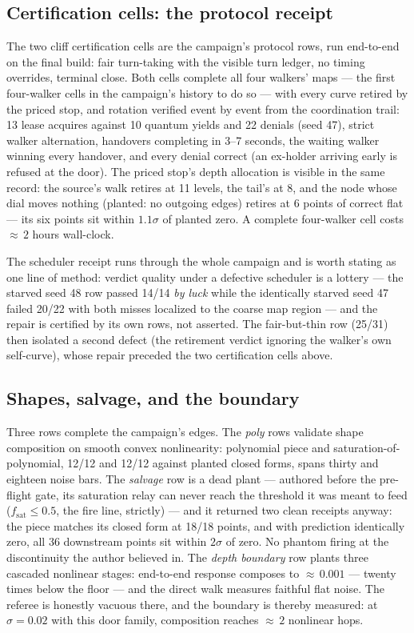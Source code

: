 \documentclass[11pt,a4paper]{article}
\begin{document}
\subsection{Certification cells: the protocol receipt}
\label{sec:cert}

The two cliff certification cells are the campaign's protocol rows,
run end-to-end on the final build: fair turn-taking with the visible
turn ledger, no timing overrides, terminal close. Both cells complete
all four walkers' maps --- the first four-walker cells in the
campaign's history to do so --- with every curve retired by the priced
stop, and rotation verified event by event from the coordination
trail: 13 lease acquires against 10 quantum yields and 22 denials
(seed 47), strict walker alternation, handovers completing in 3--7
seconds, the waiting walker winning every handover, and every denial
correct (an ex-holder arriving early is refused at the door). The
priced stop's depth allocation is visible in the same record: the
source's walk retires at 11 levels, the tail's at 8, and the node
whose dial moves nothing (planted: no outgoing edges) retires at 6
points of correct flat --- its six points sit within $1.1\sigma$ of
planted zero. A complete four-walker cell costs ${\approx}\,2$ hours
wall-clock.

The scheduler receipt runs through the whole campaign and is worth
stating as one line of method: verdict quality under a defective
scheduler is a lottery --- the starved seed 48 row passed 14/14
\emph{by luck} while the identically starved seed 47 failed 20/22
with both misses localized to the coarse map region --- and the
repair is certified by its own rows, not asserted. The fair-but-thin
row (25/31) then isolated a second defect (the retirement verdict
ignoring the walker's own self-curve), whose repair preceded the two
certification cells above.

\subsection{Shapes, salvage, and the boundary}
\label{sec:salvage}

Three rows complete the campaign's edges. The \emph{poly} rows
validate shape composition on smooth convex nonlinearity: polynomial
piece and saturation-of-polynomial, 12/12 and 12/12 against planted
closed forms, spans thirty and eighteen noise bars. The \emph{salvage}
row is a dead plant --- authored before the pre-flight gate, its
saturation relay can never reach the threshold it was meant to feed
($f_{\text{sat}} \le 0.5$, the fire line, strictly) --- and it
returned two clean receipts anyway: the piece matches its closed form
at 18/18 points, and with prediction identically zero, all 36
downstream points sit within $2\sigma$ of zero. No phantom firing at
the discontinuity the author believed in. The \emph{depth boundary}
row plants three cascaded nonlinear stages: end-to-end response
composes to ${\approx}\,0.001$ --- twenty times below the floor ---
and the direct walk measures faithful flat noise. The referee is
honestly vacuous there, and the boundary is thereby measured: at
$\sigma{=}0.02$ with this door family, composition reaches
${\approx}\,2$ nonlinear hops.
\end{document}
